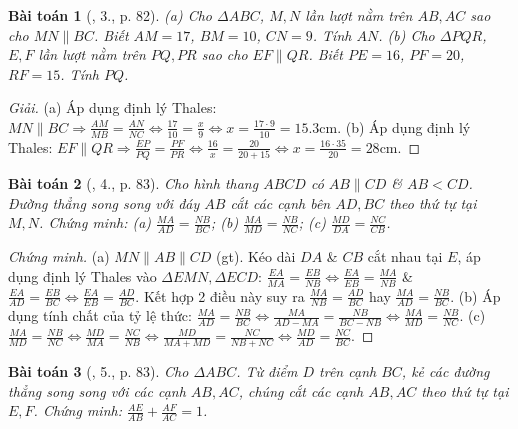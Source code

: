 \documentclass{article}
\newtheorem{baitoan}{Bài toán}
\begin{document}
\begin{baitoan}[\cite{SBT_Toan_8_tap_2}, 3., p. 82]
	(a) Cho $\Delta ABC$, $M,N$ lần lượt nằm trên $AB,AC$ sao cho $MN\parallel BC$. Biết $AM = 17$, $BM = 10$, $CN = 9$. Tính $AN$. (b) Cho $\Delta PQR$, $E,F$ lần lượt nằm trên $PQ,PR$ sao cho $EF\parallel QR$. Biết $PE = 16$, $PF = 20$, $RF = 15$. Tính $PQ$.
\end{baitoan}

\begin{proof}[Giải]
	(a) Áp dụng định lý Thales: $MN\parallel BC\Rightarrow\frac{AM}{MB} = \frac{AN}{NC}\Leftrightarrow\frac{17}{10} = \frac{x}{9}\Leftrightarrow x = \frac{17\cdot9}{10} = 15.3$cm. (b) Áp dụng định lý Thales: $EF\parallel QR\Rightarrow\frac{EP}{PQ} = \frac{PF}{PR}\Leftrightarrow\frac{16}{x} = \frac{20}{20 + 15}\Leftrightarrow x = \frac{16\cdot35}{20} = 28$cm.
\end{proof}

\begin{baitoan}[\cite{SBT_Toan_8_tap_2}, 4., p. 83]
	Cho hình thang $ABCD$ có $AB\parallel CD$ \& $AB < CD$. Đường thẳng song song với đáy $AB$ cắt các cạnh bên $AD,BC$ theo thứ tự tại $M,N$. Chứng minh: (a) $\frac{MA}{AD} = \frac{NB}{BC}$; (b) $\frac{MA}{MD} = \frac{NB}{NC}$; (c) $\frac{MD}{DA} = \frac{NC}{CB}$.
\end{baitoan}

\begin{proof}[Chứng minh]
	(a) $MN\parallel AB\parallel CD$ (gt). Kéo dài $DA$ \& $CB$ cắt nhau tại $E$, áp dụng định lý Thales vào $\Delta EMN,\Delta ECD$: $\frac{EA}{MA} = \frac{EB}{NB}\Leftrightarrow\frac{EA}{EB} = \frac{MA}{NB}$ \& $\frac{EA}{AD} = \frac{EB}{BC}\Leftrightarrow\frac{EA}{EB} = \frac{AD}{BC}$. Kết hợp 2 điều này suy ra $\frac{MA}{NB} = \frac{AD}{BC}$ hay $\frac{MA}{AD} = \frac{NB}{BC}$. (b) Áp dụng tính chất của tỷ lệ thức: $\frac{MA}{AD} = \frac{NB}{BC}\Leftrightarrow\frac{MA}{AD - MA} = \frac{NB}{BC - NB}\Leftrightarrow\frac{MA}{MD} = \frac{NB}{NC}$. (c) $\frac{MA}{MD} = \frac{NB}{NC}\Leftrightarrow\frac{MD}{MA} = \frac{NC}{NB}\Leftrightarrow\frac{MD}{MA + MD} = \frac{NC}{NB + NC}\Leftrightarrow\frac{MD}{AD} = \frac{NC}{BC}$.
\end{proof}

\begin{baitoan}[\cite{SBT_Toan_8_tap_2}, 5., p. 83]
	\label{SBT_Toan_8_tap_2 5. p. 83}
	Cho $\Delta ABC$. Từ điểm $D$ trên cạnh $BC$, kẻ các đường thẳng song song với các cạnh $AB,AC$, chúng cắt các cạnh $AB,AC$ theo thứ tự tại $E,F$. Chứng minh: $\frac{AE}{AB} + \frac{AF}{AC} = 1$.
\end{baitoan}
\end{document}
